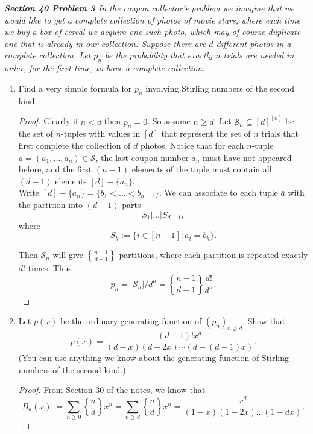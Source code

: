 \documentclass{article}
\begin{document}
\it \textbf{Section 40 Problem 3} In the coupon collector's problem we
  imagine that we would like to get a complete collection of photos of
  movie stars, where each time we buy a box of cereal we acquire one such
  photo, which may of course duplicate one that is already in our
  collection. Suppose there are $d$ different photos in a complete
  collection. Let $p_n$ be the probability that exactly $n$ trials are
  needed in order, for the first time, to have a complete collection.

  \begin{enumerate}[label={(\alph*)}]
    \item Find a very simple formula for $p_n$ involving Stirling numbers
      of the second kind.

      \begin{proof}
        Clearly if $n<d$ then $p_n=0$. So assume $n\geq d$. Let
        $\mathcal{S}_n\subseteq [d]^{[n]}$ be the set of $n$-tuples with
        values in $[d]$ that represent the set of $n$ trials that first
        complete the collection of $d$ photos. Notice that for each 
        $n$-tuple $\bar{a}=(a_1,\ldots,a_n)\in\mathcal{S}$, the last coupon
        number $a_n$ must have not appeared before, and the first $(n-1)$
        elements of the tuple must contain all $(d-1)$ elements
        $[d]-\{a_n\}$. \\
        
        Write $[d]-\{a_n\}=\{b_1<\ldots<b_{n-1}\}$. We can associate to
        each tuple $\bar{a}$ with the partition into $(d-1)$-parts
        \[S_1|\ldots|S_{d-1},\]
        where
        \[S_k:=\{i\in[n-1]: a_i=b_k\}.\]

        Then $\mathcal{S}_n$ will give ${n-1\brace d-1}$ partitions, where
        each partition is repeated exactly $d!$ times. Thus
        \[p_n =|\mathcal{S}_n|/d^n ={n-1\brace d-1}\frac{d!}{d^n}.\]
      \end{proof}

    \item Let $p(x)$ be the ordinary generating function of $(p_n)_{n\geq
      d}$. Show that
      \[p(x) =\frac{(d-1)!x^d}{(d-x)(d-2x)\cdots(d-(d-1)x)}.\]
      (You can use anything we know about the generating function of
      Stirling numbers of the second kind.)

      \begin{proof}
        From Section 30 of the notes, we know that
        \[B_d(x) :=\sum_{n\geq0} {n\brace d} x^n =\sum_{n\geq d} {n\brace
        d} x^n =\frac{x^d}{(1-x)(1-2x)\ldots(1-dx)}.\]


\end{proof}
\end{enumerate}
\end{document}
